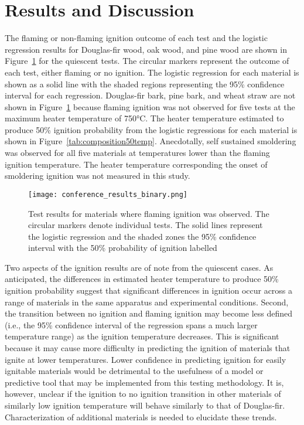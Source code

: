\section{Results and Discussion}
    \label{sec:results3}
    The flaming or non-flaming ignition outcome of each test and the logistic regression results for Douglas-fir wood, oak wood, and pine wood are shown in Figure~\ref{fig:logistic_plot} for the quiescent tests. The circular markers represent the outcome of each test, either flaming or no ignition. The logistic regression for each material is shown as a solid line with the shaded regions representing the 95\% confidence interval for each regression. Douglas-fir bark, pine bark, and wheat straw are not shown in Figure~\ref{fig:logistic_plot} because flaming ignition was not observed for five tests at the maximum heater temperature of 750\si{\celsius}. The heater temperature estimated to produce 50\% ignition probability from the logistic regressions for each material is shown in Figure~\ref{tab:composition50temp}. Anecdotally, self sustained smoldering was observed for all five materials at temperatures lower than the flaming ignition temperature. The heater temperature corresponding the onset of smoldering ignition was not measured in this study. 
        \begin{figure}[htpb]
            \centering
            \texttt{[image: conference\_results\_binary.png]}
            \caption{Test results for materials where flaming ignition was observed. The circular markers denote individual tests. The solid lines represent the logistic regression and the shaded zones the 95\% confidence interval with the 50\% probability of ignition labelled}
            \label{fig:logistic_plot}
        \end{figure}
    Two aspects of the ignition results are of note from the quiescent cases. As anticipated, the differences in estimated heater temperature to produce 50\% ignition probability suggest that significant differences in ignition occur across a range of materials in the same apparatus and experimental conditions. Second, the transition between no ignition and flaming ignition may become less defined (i.e., the 95\% confidence interval of the regression spans a much larger temperature range) as the ignition temperature decreases. This is significant because it may cause more difficulty in predicting the ignition of materials that ignite at lower temperatures. Lower confidence in predicting ignition for easily ignitable materials would be detrimental to the usefulness of a model or predictive tool that may be implemented from this testing methodology. It is, however, unclear if the ignition to no ignition transition in other materials of similarly low ignition temperature will behave similarly to that of Douglas-fir. Characterization of additional materials is needed to elucidate these trends.
    
